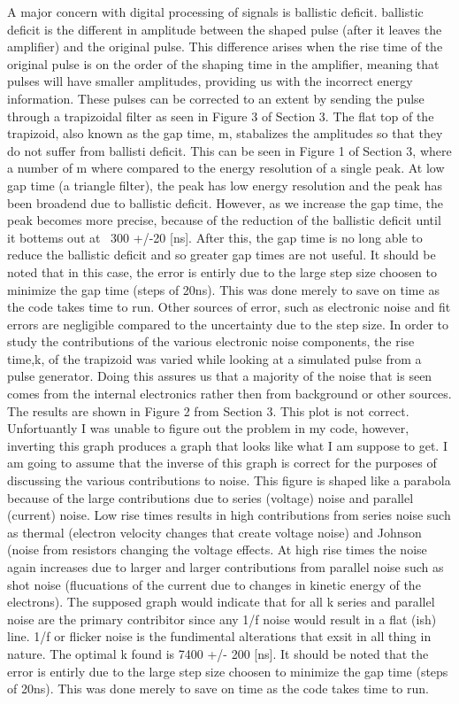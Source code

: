 A major concern with digital processing of signals is ballistic deficit. ballistic deficit is the different in amplitude between the shaped pulse (after it leaves the amplifier) 
and the original pulse. This difference arises when the rise time of the original pulse is on the order of the shaping time in the amplifier, meaning that pulses will have smaller amplitudes,
providing us with the incorrect energy information. These pulses can be corrected to an extent by sending the pulse through a trapizoidal filter as seen in Figure 3 of Section 3. 
The flat top of the trapizoid, also known as the gap time, m, stabalizes the amplitudes so that they do not suffer from ballisti deficit. This can be seen in Figure 1 of Section 3, 
where a number of m where compared to the energy resolution of a single peak. At low gap time (a triangle filter), the peak has low energy resolution and the peak has been broadend
due to ballistic deficit. However, as we increase the gap time, the peak becomes more precise, because of the reduction of the ballistic deficit until it bottems out at ~300 +/-20 [ns]. After this,
the gap time is no long able to reduce the ballistic deficit and so greater gap times are not useful. It should be noted that in this case, the error is entirly due to the large step size 
choosen to minimize the gap time (steps of 20ns). This was done merely to save on time as the code takes time to run. Other sources of error, such as electronic noise and fit errors are negligible
compared to the uncertainty due to the step size. 
\linebreak
\linebreak
In order to study the contributions of the various electronic noise components, the rise time,k, of the trapizoid was varied while looking at a simulated pulse from a pulse generator. Doing this
assures us that a majority of the noise that is seen comes from the internal electronics rather then from background or other sources. The results are shown in Figure 2 from Section 3. 
This plot is not correct. Unfortuantly I was unable to figure out the problem in my code, however, inverting this graph produces a graph that looks like what I am suppose to get. I am going
to assume that the inverse of this graph is correct for the purposes of discussing the various contributions to noise. This figure is shaped like a parabola because of the large contributions 
due to series (voltage) noise and parallel (current) noise. Low rise times results in high contributions from series noise such as thermal (electron velocity changes that create voltage noise) 
 and Johnson (noise from resistors changing the voltage  effects. At high rise times the noise
again increases due to larger and larger contributions from parallel noise such as shot noise (flucuations of the current due to changes in kinetic energy of the electrons). The supposed graph
would indicate that for all k series and parallel noise are the primary contribitor since any 1/f noise would result in a flat (ish) line. 1/f or flicker noise is the fundimental alterations 
that exsit in all thing in nature. The optimal k found is 7400 +/- 200 [ns]. It should be noted that the error is entirly due to the large step size 
choosen to minimize the gap time (steps of 20ns). This was done merely to save on time as the code takes time to run.
  
